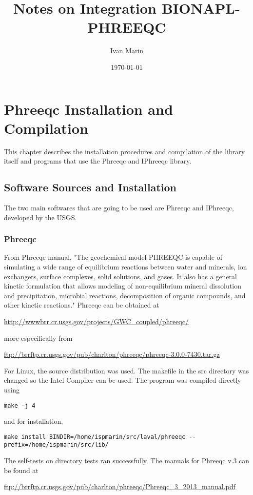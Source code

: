 \documentclass[12pt,a4paper,twoside]{report}
\title{Notes on Integration BIONAPL-PHREEQC}
\author{Ivan Marin}
\date{\today}
\begin{document}
\maketitle

\chapter{Phreeqc Installation and Compilation}
This chapter describes the installation procedures and compilation of the library itself and programs that use the Phreeqc and IPhreeqc library. 
\section{Software Sources and Installation}
The two main softwares that are going to be used are Phreeqc and IPhreeqc, developed by the USGS. 
\subsection{Phreeqc}\label{phreeqcget}

From Phreeqc manual, "The geochemical model PHREEQC is capable of simulating a wide range of equilibrium reactions between water and minerals, ion exchangers, surface complexes, solid solutions, and gases. It also has a general kinetic formulation that allows modeling of non-equilibrium mineral dissolution and precipitation, microbial reactions, decomposition of organic compounds, and other kinetic reactions." Phreeqc can be obtained at \cite{phreeqc} 

\url{http://wwwbrr.cr.usgs.gov/projects/GWC_coupled/phreeqc/}

more especifically from 

\url{ftp://brrftp.cr.usgs.gov/pub/charlton/phreeqc/phreeqc-3.0.0-7430.tar.gz}

For Linux, the source distribution was used. The makefile in the src directory was changed so the Intel Compiler can be used. The program was compiled directly using 
\begin{lstlisting}[style=Bash]
   make -j 4
\end{lstlisting}
and for installation,
\begin{lstlisting}[style=Bash]
   make install BINDIR=/home/ispmarin/src/laval/phreeqc --prefix=/home/ispmarin/src/lib/
\end{lstlisting}
The self-tests on directory tests ran successfully. The manuals for Phreeqc v.3 can be found at

\url{ftp://brrftp.cr.usgs.gov/pub/charlton/phreeqc/Phreeqc_3_2013_manual.pdf}
\end{document}
